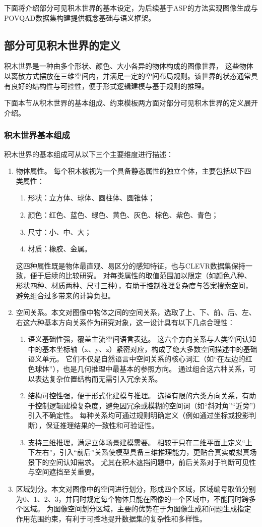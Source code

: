 下面将介绍部分可见积木世界的基本设定，为后续基于ASP的方法实现图像生成与POVQAD数据集构建提供概念基础与语义框架。
\subsection{部分可见积木世界的定义}
积木世界是一种由多个形状、颜色、大小各异的物体构成的图像世界，
这些物体以离散方式摆放在三维空间内，并满足一定的空间布局规则。该世界的状态通常具有良好的结构性与可控性，便于形式逻辑建模与基于规则的推理。

下面本节从积木世界的基本组成、约束模板两方面对部分可见积木世界的定义展开介绍。
\subsubsection{积木世界基本组成}
积木世界的基本组成可从以下三个主要维度进行描述：
\begin{enumerate}[nosep]
\item 物体属性。 每个积木被视为一个具备静态属性的独立个体，主要包括以下四类属性：
\begin{enumerate}[nosep]
\item 形状：立方体、球体、圆柱体、圆锥体；
\item 颜色：红色、蓝色、绿色、黄色、灰色、棕色、紫色、青色；
\item 尺寸：小、中、大；
\item 材质：橡胶、金属。
\end{enumerate}
这四种属性既是物体最直观、易区分的感知特征，也与CLEVR数据集保持一致，便于后续的比较研究。
对每类属性的取值范围加以限定（如颜色八种、形状四种、材质两种、尺寸三种），有助于控制推理复杂度与答案搜索空间，避免组合过多带来的计算负担。
\item 空间关系。本文对图像中物体之间的空间关系，选取了上、下、前、后、左、右这六种基本方向关系作为研究对象，这一设计具有以下几点合理性：
\begin{enumerate}[nosep]
\item 语义基础性强，覆盖主流空间语言表达。
这六个方向关系与人类空间认知中的基本坐标轴（x、y、z）紧密对应，构成了绝大多数空间描述中的基础语义单元。
它们不仅是自然语言中空间关系的核心词汇（如“在左边的红色球体”），也是几何推理中最基本的参照方向。
通过组合这六种关系，可以表达复杂位置结构而无需引入冗余关系。
\item 结构可控性强，便于形式化建模与推理。
选择有限的六类方向关系，有助于控制逻辑建模复杂度，避免因冗余或模糊的空间词（如“斜对角”“近旁”）引入不确定性。
每种关系均可通过规则明确定义（例如通过坐标或投影判断），保证推理结果的一致性和可验证性。
\item 支持三维推理，满足立体场景建模需要。
相较于只在二维平面上定义“上下左右”，引入“前后”关系使模型具备三维推理能力，更贴合真实或拟真场景下的空间认知需求。
尤其在积木遮挡问题中，前后关系对于判断可见性与空间遮挡至关重要。
\end{enumerate}
\item 区域划分。本文对图像中的空间进行划分，形成四个区域，区域编号取值分别为0、1、2、3，并同时规定每个物体只能在图像的一个区域中，不能同时跨多个区域。
为图像空间划分区域，主要的优势在于为图像生成和问题生成指定作用范围约束，有利于可控地提升数据集的复杂性和多样性。
\end{enumerate}
